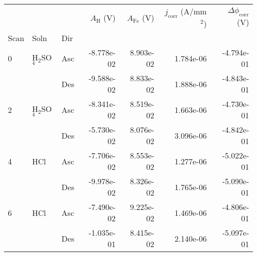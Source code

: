 \begin{tabular}{lllrrrr}
\toprule
  &     &     &  $A_{\text{H}}$ (V) &  $A_{\text{Fe}}$ (V) &  $j_{\text{corr}}$ (A/mm$^2$) &  $\Delta \phi_{\text{corr}}$ (V) \\
Scan & Soln & Dir &                     &                      &                               &                                  \\
\midrule
0 & H$_2$SO$_4$ & Asc &          -8.778e-02 &            8.903e-02 &                     1.784e-06 &                       -4.794e-01 \\
  &     & Des &          -9.588e-02 &            8.833e-02 &                     1.888e-06 &                       -4.843e-01 \\
2 & H$_2$SO$_4$ & Asc &          -8.341e-02 &            8.519e-02 &                     1.663e-06 &                       -4.730e-01 \\
  &     & Des &          -5.730e-02 &            8.076e-02 &                     3.096e-06 &                       -4.842e-01 \\
4 & HCl & Asc &          -7.706e-02 &            8.553e-02 &                     1.277e-06 &                       -5.022e-01 \\
  &     & Des &          -9.978e-02 &            8.326e-02 &                     1.765e-06 &                       -5.090e-01 \\
6 & HCl & Asc &          -7.490e-02 &            9.225e-02 &                     1.469e-06 &                       -4.806e-01 \\
  &     & Des &          -1.035e-01 &            8.415e-02 &                     2.140e-06 &                       -5.097e-01 \\
\bottomrule
\end{tabular}
